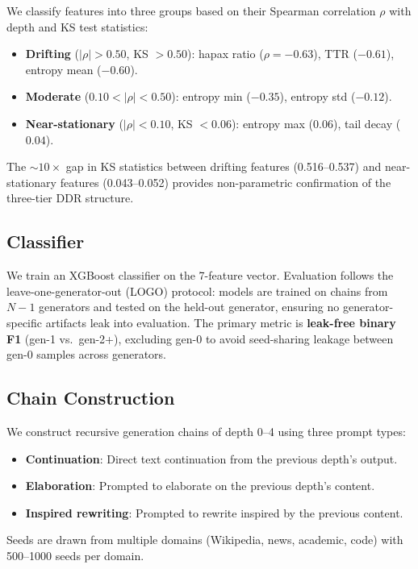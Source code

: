 \documentclass[11pt,a4paper]{article}
\begin{document}
We classify features into three groups based on their Spearman correlation $\rho$ with depth and KS test statistics:
\begin{itemize}[nosep,leftmargin=*]
\item \textbf{Drifting} ($|\rho| > 0.50$, KS $> 0.50$): hapax ratio ($\rho = -0.63$), TTR ($-0.61$), entropy mean ($-0.60$).
\item \textbf{Moderate} ($0.10 < |\rho| < 0.50$): entropy min ($-0.35$), entropy std ($-0.12$).
\item \textbf{Near-stationary} ($|\rho| < 0.10$, KS $< 0.06$): entropy max ($0.06$), tail decay ($0.04$).
\end{itemize}

The ${\sim}10\times$ gap in KS statistics between drifting features (0.516--0.537) and near-stationary features (0.043--0.052) provides non-parametric confirmation of the three-tier DDR structure.

\subsection{Classifier}

We train an XGBoost classifier on the 7-feature vector. Evaluation follows the leave-one-generator-out (LOGO) protocol: models are trained on chains from $N{-}1$ generators and tested on the held-out generator, ensuring no generator-specific artifacts leak into evaluation. The primary metric is \textbf{leak-free binary F1} (gen-1 vs.\ gen-2+), excluding gen-0 to avoid seed-sharing leakage between gen-0 samples across generators.

\subsection{Chain Construction}

We construct recursive generation chains of depth 0--4 using three prompt types:
\begin{itemize}[nosep,leftmargin=*]
\item \textbf{Continuation}: Direct text continuation from the previous depth's output.
\item \textbf{Elaboration}: Prompted to elaborate on the previous depth's content.
\item \textbf{Inspired rewriting}: Prompted to rewrite inspired by the previous content.
\end{itemize}

Seeds are drawn from multiple domains (Wikipedia, news, academic, code) with 500--1000 seeds per domain.
\end{document}
